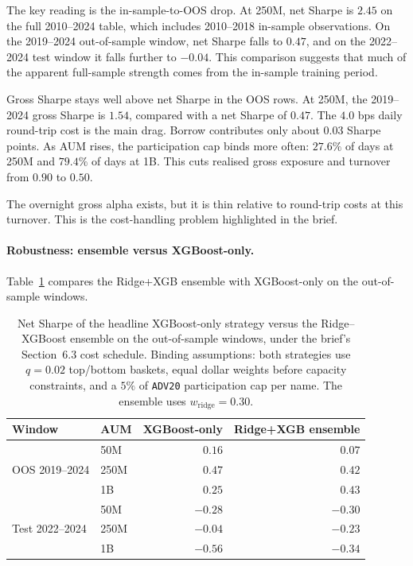 \documentclass[12pt]{article}
\begin{document}
The key reading is the in-sample-to-OOS drop. At 250M, net Sharpe is $2.45$ on the full 2010--2024 table, which includes 2010--2018 in-sample observations. On the 2019--2024 out-of-sample window, net Sharpe falls to $0.47$, and on the 2022--2024 test window it falls further to $-0.04$. This comparison suggests that much of the apparent full-sample strength comes from
the in-sample training period.

Gross Sharpe stays well above net Sharpe in the OOS rows. At 250M, the 2019--2024 gross Sharpe is $1.54$, compared with a net Sharpe of $0.47$. The $4.0$ bps daily round-trip cost is the main drag. Borrow contributes only about
$0.03$ Sharpe points. As AUM rises, the participation cap binds more often: $27.6\%$ of days at 250M and $79.4\%$ of days at 1B. This cuts realised gross exposure and turnover from $0.90$ to $0.50$.

The overnight gross alpha exists, but it is thin relative to round-trip costs at this turnover. This is the cost-handling problem highlighted in the brief.

\paragraph{Robustness: ensemble versus XGBoost-only.}
Table~\ref{tab:step5-ensemble} compares the Ridge+XGB ensemble with XGBoost-only on the out-of-sample windows.

\begin{table}[H]
  \centering
  \begin{tabular}{llrr}
    \toprule
    Window & AUM & XGBoost-only & Ridge+XGB ensemble \\
    \midrule
    \multirow{3}{*}{OOS 2019--2024}
         & 50M  & $0.16$  & $0.07$  \\
         & 250M & $0.47$  & $0.42$  \\
         & 1B   & $0.25$  & $0.43$  \\
    \midrule
    \multirow{3}{*}{Test 2022--2024}
         & 50M  & $-0.28$ & $-0.30$ \\
         & 250M & $-0.04$ & $-0.23$ \\
         & 1B   & $-0.56$ & $-0.34$ \\
    \bottomrule
  \end{tabular}
  \caption{Net Sharpe of the headline XGBoost-only strategy versus the Ridge--XGBoost ensemble on the out-of-sample windows, under the brief's Section~6.3 cost schedule. Binding assumptions: both strategies use $q=0.02$ top/bottom baskets, equal dollar weights before capacity constraints, and a $5\%$ of \texttt{ADV20} participation cap per name. The ensemble uses $w_{\text{ridge}}=0.30$.}
  \label{tab:step5-ensemble}
\end{table}
\end{document}
